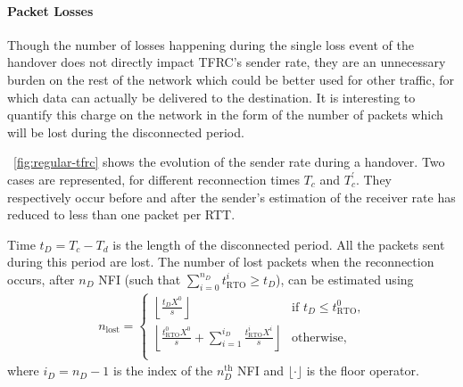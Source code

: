 \documentclass[twocolumn]{nictatechreport}
\begin{document}
\paragraph{Packet Losses}

Though the number of losses happening during the single loss event of the
handover does not directly impact TFRC's sender rate, they are an unnecessary
burden on the rest of the network which could be better used for other traffic,
for which data can actually be delivered to the destination. It is interesting
to quantify this charge on the network in the form of the number of packets
which will be lost during the disconnected period.

\figurename~\ref{fig:regular-tfrc} shows the evolution of the sender rate during
a handover. Two cases are represented, for different reconnection times $T_c$
and $T_c^\prime$. They respectively occur before and after the sender's
estimation of the receiver rate has reduced to less than one packet per RTT.

Time $t_D = T_c - T_d$ is the length of the disconnected period.  All the
packets sent during this period are lost.  The number of lost packets when the
reconnection occurs, after $n_D$ NFI (such that
$\sum_{i=0}^{n_D}t_\mathrm{RTO}^i \ge t_D$), can be estimated using
\begin{gather}
  \label{eq:numerical-packet-losses}
  n_\mathrm{lost} = \begin{cases}
    \left\lfloor \frac{t_DX^0}s \right\rfloor & \text{if $t_D \le t_\mathrm{RTO}^0$,} \\
      \left\lfloor \frac{t_\mathrm{RTO}^0X^0}s + \sum_{i=1}^{i_D} \frac{t_\mathrm{RTO}^iX^i}s \right\rfloor & \text{otherwise,}\\
  \end{cases}
\end{gather}
where $i_D=n_D-1$ is the index of the $n_D^\mathrm{th}$ NFI and
$\lfloor\cdot\rfloor$ is the floor operator.
\end{document}
